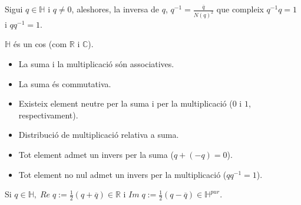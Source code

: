 \documentclass[../main.tex]{subfiles}
\begin{document}
	\begin{definicio}
		Sigui $q \in \mathbb{H}$ i $q \neq 0$, aleshores, la inversa de $q$, $q^{-1} = \frac{\overline{q}}{N(q)^2}$ que compleix $q^{-1}q = 1$ i $qq^{-1} = 1$.
	\end{definicio}
	\begin{teorema}
	    $\mathbb{H}$ és un cos (com $\mathbb{R}\text{ i }\mathbb{C}$).
	\end{teorema}
	\begin{demostracio}
	\begin{itemize}
			\item La suma i la multiplicació són associatives.
			\item La suma és commutativa.
			\item Existeix element neutre per la suma i per la multiplicació ($0$ i $1$, respectivament).
			\item Distribució de multiplicació relativa a suma.
			\item Tot element admet un invers per la suma ($q+(-q) = 0$).
			\item Tot element no nul admet un invers per la multiplicació ($qq^{-1} = 1$).
		\end{itemize}
	\end{demostracio}
	\begin{notacio}
		Si $q \in \mathbb{H},\;Re\;q := \frac{1}{2}\left(q + \overline{q}\right) \in \mathbb{R}$ i $Im\;q := \frac{1}{2}\left(q - \overline{q}\right) \in \mathbb{H}^{pur}$.\\
	\end{notacio}
\end{document}
